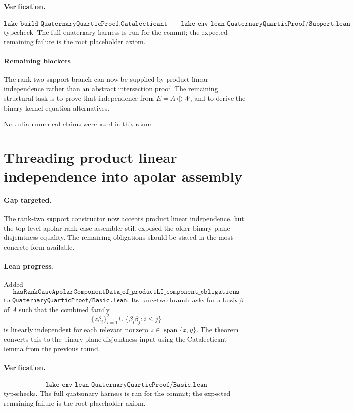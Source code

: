 \documentclass[11pt]{article}
\begin{document}
\paragraph{Verification.}
\[
\texttt{lake build QuaternaryQuarticProof.Catalecticant}
\qquad
\texttt{lake env lean QuaternaryQuarticProof/Support.lean}
\]
typecheck.  The full quaternary harness is run for the commit; the expected
remaining failure is the root placeholder axiom.

\paragraph{Remaining blockers.}
The rank-two support branch can now be supplied by product linear independence
rather than an abstract intersection proof.  The remaining structural task is
to prove that independence from \(E=A\oplus W\), and to derive the binary
kernel-equation alternatives.

No Julia numerical claims were used in this round.

\section*{Threading product linear independence into apolar assembly}

\paragraph{Gap targeted.}
The rank-two support constructor now accepts product linear independence, but
the top-level apolar rank-case assembler still exposed the older binary-plane
disjointness equality.  The remaining obligations should be stated in the most
concrete form available.

\paragraph{Lean progress.}
Added
\[
\texttt{hasRankCaseApolarComponentData\_of\_productLI\_component\_obligations}
\]
to \texttt{QuaternaryQuarticProof/Basic.lean}.  Its rank-two branch asks for a
basis \(\beta\) of \(A\) such that the combined family
\[
\{z\beta_i\}_{i=1}^2
\cup
\{\beta_i\beta_j:i\le j\}
\]
is linearly independent for each relevant nonzero
\(z\in\operatorname{span}\{x,y\}\).  The theorem converts this to the
binary-plane disjointness input using the Catalecticant lemma from the previous
round.

\paragraph{Verification.}
\[
\texttt{lake env lean QuaternaryQuarticProof/Basic.lean}
\]
typechecks.  The full quaternary harness is run for the commit; the expected
remaining failure is the root placeholder axiom.
\end{document}
